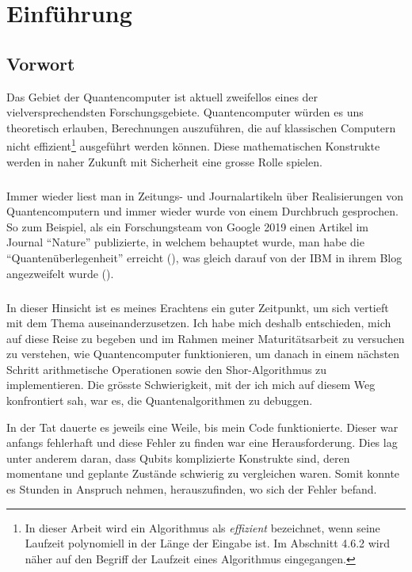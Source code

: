 \chapter{Einführung}
\section{Vorwort}
Das Gebiet der Quantencomputer ist aktuell zweifellos eines der vielversprechendsten Forschungsgebiete. Quantencomputer würden es uns theoretisch erlauben, Berechnungen auszuführen, die auf klassischen Computern nicht effizient\footnote{In dieser Arbeit wird ein Algorithmus als \textit{effizient} bezeichnet, wenn seine Laufzeit polynomiell in der Länge der Eingabe ist. Im Abschnitt 4.6.2 wird näher auf den Begriff der Laufzeit eines Algorithmus eingegangen.} ausgeführt werden können. Diese mathematischen Konstrukte werden in naher Zukunft mit Sicherheit eine grosse Rolle spielen. 

\paragraph{}

Immer wieder liest man in Zeitungs- und Journalartikeln über Realisierungen von Quantencomputern und immer wieder wurde von einem Durchbruch gesprochen. So zum Beispiel, als ein Forschungsteam von Google 2019 einen Artikel im Journal "`Nature"' publizierte, in welchem behauptet wurde, man habe die "`Quantenüberlegenheit"' erreicht (\cite{GSP}), was gleich darauf von der IBM in ihrem Blog angezweifelt wurde (\cite{IBM}).

\paragraph{}

In dieser Hinsicht ist es meines Erachtens ein guter Zeitpunkt, um sich vertieft mit dem Thema auseinanderzusetzen. Ich habe mich deshalb entschieden, mich auf diese Reise zu begeben und im Rahmen meiner Maturitätsarbeit zu versuchen zu verstehen, wie Quantencomputer funktionieren, um danach in einem nächsten Schritt arithmetische Operationen sowie den Shor-Algorithmus zu implementieren. Die grösste Schwierigkeit, mit der ich mich auf diesem Weg konfrontiert sah, war es, die Quantenalgorithmen zu debuggen.

In der Tat dauerte es jeweils eine Weile, bis mein Code funktionierte. Dieser war anfangs fehlerhaft und diese Fehler zu finden war eine Herausforderung. Dies lag unter anderem daran, dass Qubits komplizierte Konstrukte sind, deren momentane und geplante Zustände schwierig zu vergleichen waren. Somit konnte es Stunden in Anspruch nehmen, herauszufinden, wo sich der Fehler befand.

